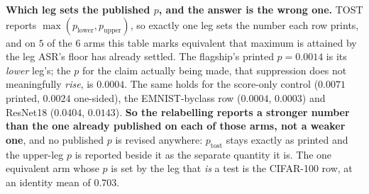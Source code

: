 \documentclass{article}
\begin{document}
\noindent \textbf{Which leg sets the published $p$, and the answer is the wrong one.} TOST reports
$\max(p_{\mathrm{lower}},p_{\mathrm{upper}})$, so exactly one leg sets the number each row prints, and on
$5$ of the $6$ arms this table marks equivalent that maximum is attained by the leg ASR's floor has
already settled. The flagship's printed $p{=}0.0014$ is its \emph{lower} leg's; the $p$ for the claim
actually being made, that suppression does not meaningfully \emph{rise}, is $0.0004$. The same holds for
the score-only control ($0.0071$ printed, $0.0024$ one-sided), the EMNIST-byclass row ($0.0004$,
$0.0003$) and ResNet18 ($0.0404$, $0.0143$). \textbf{So the relabelling reports a stronger number than
the one already published on each of those arms, not a weaker one}, and no published $p$ is revised
anywhere: $p_{\mathrm{tost}}$ stays exactly as printed and the upper-leg $p$ is reported beside it as the
separate quantity it is. The one equivalent arm whose $p$ is set by the leg that \emph{is} a test is the
CIFAR-100 row, at an identity mean of $0.703$.
\end{document}
